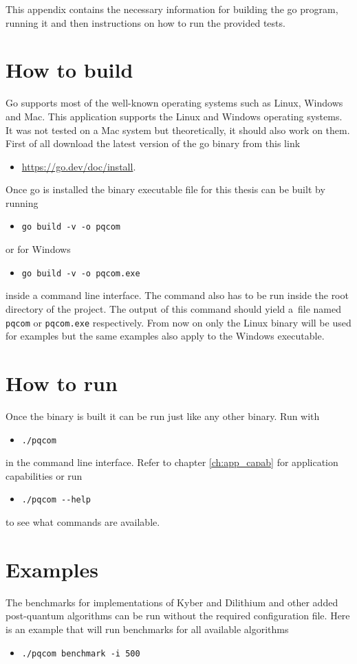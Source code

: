 This appendix contains the necessary information for building the go program, running it and then instructions on how to run the provided tests.

\section{How to build}
Go supports most of the well-known operating systems such as Linux, Windows and Mac. This application supports the Linux and Windows operating systems. It was not tested on a Mac system but theoretically, it should also work on them. First of all download the latest version of the go binary from this link
\begin{itemize}
  \item \url{https://go.dev/doc/install}.
\end{itemize}
Once go is installed the binary executable file for this thesis can be built by running
\begin{itemize}
  \item \texttt{go build -v -o pqcom}
\end{itemize}
or for Windows
\begin{itemize}
  \item \texttt{go build -v -o pqcom.exe}
\end{itemize}
inside a command line interface. The command also has to be run inside the root directory of the project. The output of this command should yield a~file named \texttt{pqcom} or \texttt{pqcom.exe} respectively. From now on only the Linux binary will be used for examples but the same examples also apply to the Windows executable.
\section{How to run}
Once the binary is built it can be run just like any other binary. Run with
\begin{itemize}
  \item \texttt{./pqcom}
\end{itemize}
in the command line interface. Refer to chapter \ref{ch:app_capab} for application capabilities or run
\begin{itemize}
  \item \texttt{./pqcom -\--help}
\end{itemize}
to see what commands are available.

\section{Examples}
The benchmarks for implementations of Kyber and Dilithium and other added post-quantum algorithms can be run without the required configuration file. Here is an example that will run benchmarks for all available algorithms
\begin{itemize}
  \item \texttt{./pqcom benchmark -i 500}
\end{itemize}

